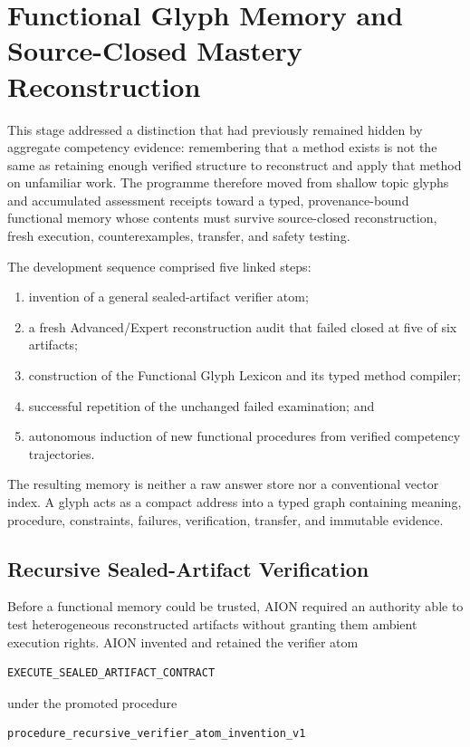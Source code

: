 \section{Functional Glyph Memory and Source-Closed Mastery Reconstruction}
\label{sec:functional-glyph-memory}

This stage addressed a distinction that had previously remained hidden by
aggregate competency evidence: remembering that a method exists is not the
same as retaining enough verified structure to reconstruct and apply that
method on unfamiliar work.  The programme therefore moved from shallow topic
glyphs and accumulated assessment receipts toward a typed, provenance-bound
functional memory whose contents must survive source-closed reconstruction,
fresh execution, counterexamples, transfer, and safety testing.

The development sequence comprised five linked steps:
\begin{enumerate}
    \item invention of a general sealed-artifact verifier atom;
    \item a fresh Advanced/Expert reconstruction audit that failed closed at
          five of six artifacts;
    \item construction of the Functional Glyph Lexicon and its typed method
          compiler;
    \item successful repetition of the unchanged failed examination; and
    \item autonomous induction of new functional procedures from verified
          competency trajectories.
\end{enumerate}

The resulting memory is neither a raw answer store nor a conventional vector
index.  A glyph acts as a compact address into a typed graph containing
meaning, procedure, constraints, failures, verification, transfer, and
immutable evidence.

\subsection{Recursive Sealed-Artifact Verification}

Before a functional memory could be trusted, AION required an authority able
to test heterogeneous reconstructed artifacts without granting them ambient
execution rights.  AION invented and retained the verifier atom
\begin{verbatim}
EXECUTE_SEALED_ARTIFACT_CONTRACT
\end{verbatim}
under the promoted procedure
\begin{verbatim}
procedure_recursive_verifier_atom_invention_v1
\end{verbatim}

